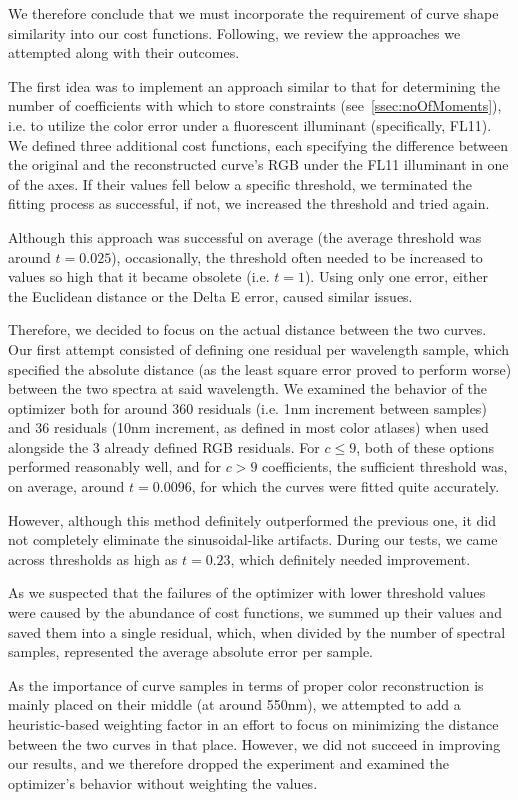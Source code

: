 We therefore conclude that we must incorporate the requirement of curve shape similarity into our cost functions. Following, we review the approaches we attempted along with their outcomes.

The first idea was to implement an approach similar to that for determining the number of coefficients with which to store constraints (see~\cref{ssec:noOfMoments}), i.e. to utilize the color error under a fluorescent illuminant (specifically, FL11). We defined three additional cost functions, each specifying the difference between the original and the reconstructed curve's RGB under the FL11 illuminant in one of the axes. If their values fell below a specific threshold, we terminated the fitting process as successful, if not, we increased the threshold and tried again.

Although this approach was successful on average (the average threshold was around $t = 0.025$), occasionally, the threshold often needed to be increased to values so high that it became obsolete (i.e. $t = 1$). Using only one error, either the Euclidean distance or the Delta E error, caused similar issues.

Therefore, we decided to focus on the actual distance between the two curves. Our first attempt consisted of defining one residual per wavelength sample, which specified the absolute distance (as the least square error proved to perform worse) between the two spectra at said wavelength. We examined the behavior of the optimizer both for around 360 residuals (i.e. 1nm increment between samples) and 36 residuals (10nm increment, as defined in most color atlases) when used alongside the 3 already defined RGB residuals. For $c \le 9$, both of these options performed reasonably well, and for $c > 9$ coefficients, the sufficient threshold was, on average, around $t = 0.0096$, for which the curves were fitted quite accurately.

However, although this method definitely outperformed the previous one, it did not completely eliminate the sinusoidal-like artifacts. During our tests, we came across thresholds as high as $t = 0.23$, which definitely needed improvement.

As we suspected that the failures of the optimizer with lower threshold values were caused by the abundance of cost functions, we summed up their values and saved them into a single residual, which, when divided by the number of spectral samples, represented the average absolute error per sample.

As the importance of curve samples in terms of proper color reconstruction is mainly placed on their middle (at around 550nm), we attempted to add a heuristic-based weighting factor in an effort to focus on minimizing the distance between the two curves in that place. However, we did not succeed in improving our results, and we therefore dropped the experiment and examined the optimizer's behavior without weighting the values.

